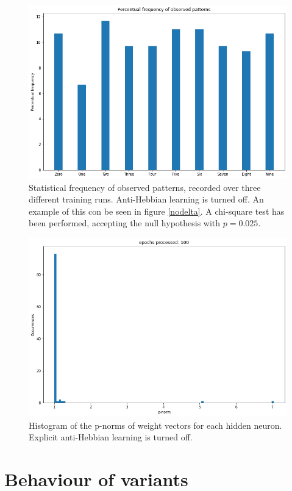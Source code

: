 \documentclass[a4paper]{report}
\begin{document}
\begin{figure} [H]
    \centering
    \includegraphics [width=12cm ] {o/bar1.png}
    \caption{Statistical frequency of observed patterns, recorded over three different training runs. Anti-Hebbian learning is turned off. An example of this con be seen in figure \ref{nodelta}. A chi-square test has been performed, accepting the null hypothesis with $p  = 0.025$.}
    \label{o/cerchio2}
\end{figure}
\begin{figure} [H]
\centering
\includegraphics [width=12cm ] {o/ii_hist.png}
\caption{Histogram of the p-norms of weight vectors for each hidden neuron. Explicit anti-Hebbian learning is turned off.}
\label{ii_hist}
\end{figure}

\chapter{Behaviour of variants}
\end{document}
